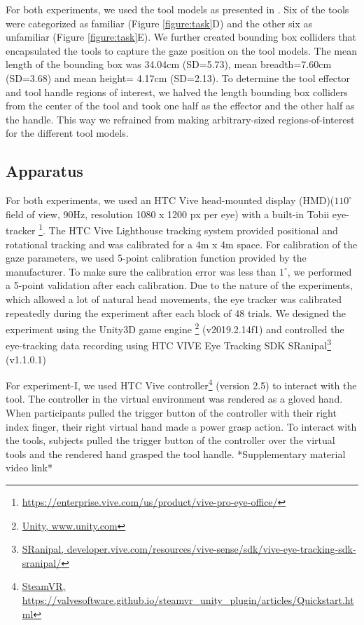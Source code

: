 For both experiments, we used the tool models as presented in \citet{Belardinelli2016-xb}. Six of the tools were categorized as familiar (Figure \ref{figure:task}D) and the other six as unfamiliar (Figure \ref{figure:task}E). We further created bounding box colliders that encapsulated the tools to capture the gaze position on the tool models. The mean length of the bounding box was 34.04cm (SD=5.73), mean breadth=7.60cm (SD=3.68) and mean height= 4.17cm (SD=2.13). To determine the tool effector and tool handle regions of interest, we halved the length bounding box colliders from the center of the tool and took one half as the effector and the other half as the handle. This way we refrained from making arbitrary-sized regions-of-interest for the different tool models. 

\subsection{Apparatus}
For both experiments, we used an HTC Vive head-mounted display (HMD)($110^\circ$ field of view, 90Hz, resolution 1080 x 1200 px per eye) with a built-in Tobii  eye-tracker \footnote{\href{https://enterprise.vive.com/us/product/vive-pro-eye/}{https://enterprise.vive.com/us/product/vive-pro-eye-office/}}. The HTC Vive Lighthouse tracking system provided positional and rotational tracking and was calibrated for a 4m x 4m space. For calibration of the gaze parameters, we used 5-point calibration function provided by the manufacturer. To make sure the calibration error was less than $1^\circ$, we performed a 5-point validation after each calibration. Due to the nature of the experiments, which allowed a lot of natural head movements, the eye tracker was calibrated repeatedly during the experiment after each block of 48 trials. We designed the experiment using the Unity3D game engine \footnote{\href{www.unity.com}{Unity, www.unity.com}} (v2019.2.14f1) and controlled the eye-tracking data recording using HTC VIVE Eye Tracking SDK SRanipal\footnote{\href{https://developer.vive.com/resources/vive-sense/sdk/vive-eye-tracking-sdk-sranipal/}{SRanipal, developer.vive.com/resources/vive-sense/sdk/vive-eye-tracking-sdk-sranipal/}} (v1.1.0.1)

For experiment-I, we used HTC Vive controller\footnote{\href{https://valvesoftware.github.io/steamvr_unity_plugin/articles/Quickstart.html}{SteamVR, https://valvesoftware.github.io/steamvr\_unity\_plugin/articles/Quickstart.html}} (version 2.5) to interact with the tool. The controller in the virtual environment was rendered as a gloved hand. When participants pulled the trigger button of the controller with their right index finger, their right virtual hand made a power grasp action. To interact with the tools, subjects pulled the trigger button of the controller over the virtual tools and the rendered hand grasped the tool handle. *Supplementary material video link*

